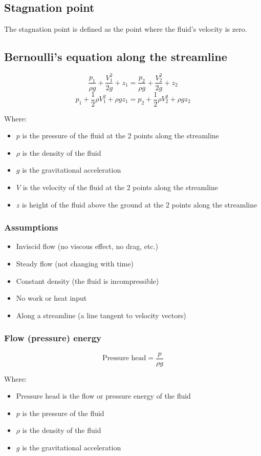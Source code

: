 \documentclass[11pt]{article}
\begin{document}
\subsection{Stagnation point}
\label{sec:org074e5dd}
The stagnation point is defined as the point where the fluid's velocity is zero.
\subsection{Bernoulli's equation along the streamline}
\label{sec:org5a4025e}
\[\frac{p_1}{\rho g} + \frac{V_1^2}{2g} + z_1 = \frac{p_2}{\rho g} + \frac{V_2^2}{2g} + z_2\]
\[p_1 + \frac{1}{2} \rho V_1^2 + \rho gz_1 = p_2 + \frac{1}{2} \rho V_2^2 + \rho gz_2\]

Where:
\begin{itemize}
\item \(p\) is the pressure of the fluid at the 2 points along the streamline
\item \(\rho\) is the density of the fluid
\item \(g\) is the gravitational acceleration
\item \(V\) is the velocity of the fluid at the 2 points along the streamline
\item \(z\) is height of the fluid above the ground at the 2 points along the streamline
\end{itemize}
\subsubsection{Assumptions}
\label{sec:org386a21d}
\begin{itemize}
\item Inviscid flow (no viscous effect, no drag, etc.)
\item Steady flow (not changing with time)
\item Constant density (the fluid is incompressible)
\item No work or heat input
\item Along a streamline (a line tangent to velocity vectors)
\end{itemize}
\subsubsection{Flow (pressure) energy}
\label{sec:orge8816a7}
\[\text{Pressure head} = \frac{p}{\rho g}\]

Where:
\begin{itemize}
\item \(\text{Pressure head}\) is the flow or pressure energy of the fluid
\item \(p\) is the pressure of the fluid
\item \(\rho\) is the density of the fluid
\item \(g\) is the gravitational acceleration
\end{itemize}
\end{document}
